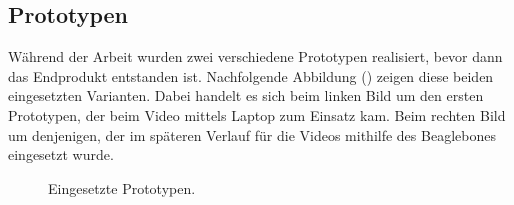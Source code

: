 \subsection{Prototypen}
Während der Arbeit wurden zwei verschiedene Prototypen realisiert, bevor dann das Endprodukt entstanden ist. Nachfolgende Abbildung () zeigen diese beiden eingesetzten Varianten. Dabei handelt es sich beim linken Bild um den ersten Prototypen, der beim Video mittels Laptop zum Einsatz kam. Beim rechten Bild um denjenigen, der im späteren Verlauf für die Videos mithilfe des Beaglebones eingesetzt wurde.

\begin{figure}[H]
  \centering
  \caption{Eingesetzte Prototypen.}
  \label{bPrototypen}
\end{figure}